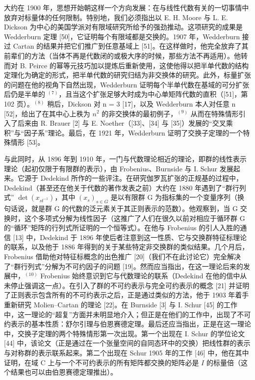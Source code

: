 大约在 1900 年，思想开始朝这样一个方向发展：在与线性代数有关的一切事情中放弃对标量体的任何限制。特别地，我们必须指出以 E. H. Moore 与 L. E. Dickson 为中心的美国学派对有限域研究所给予的强劲推动。这项研究的成果是 Wedderburn 定理 {[}50{]}，它证明每个有限域都是交换的。1907 年，Wedderburn 接过 Cartan 的结果并把它们推广到任意基域上 {[}51{]}。在这样做时，他完全放弃了其前辈们的方法（当体不再是代数闭的或极大序的时候，那些方法不再适用）。他转而对 B. Peirce 的幂等元技巧加以提炼后重新使用，这使他得以把半单代数的结构定理化为确定的形式，把半单代数的研究归结为非交换体的研究。此外，标量扩张的问题在他的视角下自然出现，Wedderburn 证明每个半单代数在基域的可分扩张后仍是半单的 \(^{(7)}\)，且当这个扩张足够大时成为中心单矩阵代数的直积（{[}51{]}，第 102 页）。\(^{(8)}\) 稍后，Dickson 对 n = 3 {[}17{]}，以及 Wedderburn 本人对任意 n {[}52{]}，给出了在其中心上秩为 \(n^{2}\) 的非交换体的最初例子，\(^{(9)}\) 从而在特殊情形引入了后来由 R. Brauer {[}2{]} 与 E. Noether（{[}33{]}、{[}34{]} 与 {[}35{]}）发展的“交叉乘积”与“因子系”理论。最后，在 1921 年，Wedderburn 证明了交换子定理的一个特殊情形 {[}53{]}。

与此同时，从 1896 年到 1910 年，一门与代数理论相近的理论，即群的线性表示理论（起初仅限于有限群的表示），由 Frobenius、Burnside 与 I. Schur 发展起来。它源于 Dedekind 所作的一些评注。在研究伽罗瓦扩张的正规基的过程中，Dedekind（甚至还在他关于代数的著作发表之前）大约在 1880 年遇到了“群行列式” \(\det(x_{st^{-1}})\)，其中 \((x_{s})_{s\in G}\) 是以有限群 G 为指标集的一个变量序列（换句话说，就是群 G 的代数的泛元素关于其正则表示的范数）。他观察到，当 G 交换时，这个多项式分解为线性因子（这推广了人们在很久以前对相应于循环群 G 的“循环”矩阵的行列式所证明的一个恒等式）。在他与 Frobenius 的引人入胜的通信 {[}13{]} 中，Dedekind 于 1896 年使后者注意到这一性质、它与交换群特征标理论的联系，以及他于 1886 年得到的关于某些特定非交换群的类似结果。几个月后，Frobenius 借助他对特征标概念的出色推广 {[}20{]}（我们不在此讨论它）完全解决了“群行列式”分解为不可约因子的问题 {[}19{]}。然而应当指出，在这一理论后来的发展中，\(^{(10)}\) Frobenius 始终意识到它与代数理论的联系（Dedekind 在他的信中从未停止强调这一点）。在引入了群的不可约表示与完全可约表示的概念 {[}21{]} 并证明了正则表示包含所有的不可约表示之后，正是通过类似的方法，他于 1903 年着手重新研究 Molien--Cartan 的理论 {[}22{]}。在 Burnside {[}3{]} 与 I. Schur {[}45{]} 的工作中，这一理论的“超复”方面并未明显地介入；但正是在他们的工作中，出现了不可约表示的基本性质：舒尔引理与伯恩赛德定理。最后还应当指出，正是在这一理论中，交换子定理的两个特殊情形第一次出现。第一个出现在 I. Schur 的学位论文 {[}44{]} 中，该论文（正是通过在一个张量空间的自同态环中的交换）把线性群的表示与对称群的表示联系起来。第二个出现在 Schur 1905 年的工作 {[}46{]} 中，他在其中证明，在域 C 上与一个不可约表示的所有矩阵都交换的矩阵必是 \(I\) 的标量倍（这个结果也可以由伯恩赛德定理推出）。

